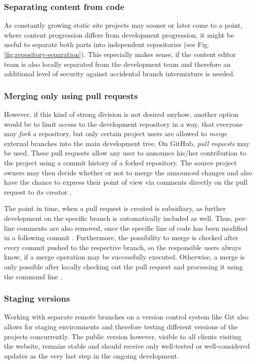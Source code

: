 \subsubsection{Separating content from code}
As constantly growing static site projects may sooner or later come to a point, where content progression differs from development progression, it might be useful to separate both parts into independent repositories (see Fig. \ref{fig:repository-separation}). This especially makes sense, if the content editor team is also locally separated from the development team and therefore an additional level of security against accidental branch intermixture is needed.

\subsubsection{Merging only using pull requests}
However, if this kind of strong division is not desired anyhow, another option would be to limit access to the development repository in a way, that everyone may \emph{fork} a repository, but only certain project users are allowed to \emph{merge} external branches into the main development tree. On GitHub, \emph{pull requests} may be used. These pull requests allow any user to announce his/her contribution to the project using a commit history of a forked repository. The source project owners may then decide whether or not to merge the announced changes and also have the chance to express their point of view via comments directly on the pull request to its creator \cite[p. 394f]{loeliger2012version}.

The point in time, when a pull request is created is subsidiary, as further development on the specific branch is automatically included as well. Thus, per-line comments are also removed, once the specific line of code has been modified in a following commit \cite{GithubPullRequests}. Furthermore, the possibility to merge is checked after every commit pushed to the respective branch, so the responsible users always know, if a merge operation may be successfully executed. Otherwise, a merge is only possible after locally checking out the pull request and processing it using the command line \cite{GithubMergePullRequests}.

\subsubsection{Staging versions}
Working with separate remote branches on a version control system like Git also allows for staging environments and therefore testing different versions of the projects concurrently. The public version however, visible to all clients visiting the website, remains stable and should receive only well-tested or well-considered updates as the very last step in the ongoing development.

